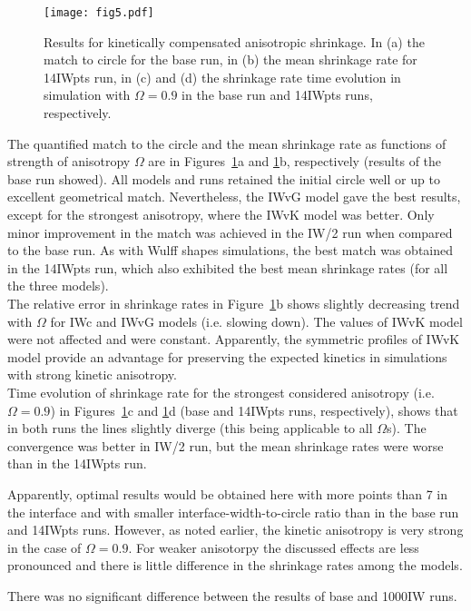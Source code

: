 \begin{figure}[]
	\centering
	\texttt{[image: fig5.pdf]}
	\caption{Results for kinetically compensated anisotropic shrinkage. In (a) the match to circle for the base run, in (b) the mean shrinkage rate for 14IWpts run, in (c) and (d) the shrinkage rate time evolution in simulation with $\Omega=0.9$ in the base run and 14IWpts runs, respectively.}
	\label{fig_companiso}
\end{figure}

The quantified match to the circle and the mean shrinkage rate as functions of strength of anisotropy $\Omega$ are in Figures~\ref{fig_companiso}a and \ref{fig_companiso}b, respectively (results of the base run showed). All models and runs retained the initial circle well or up to excellent geometrical match. Nevertheless, the IWvG model gave the best results, except for the strongest anisotropy, where the IWvK model was better. Only minor improvement in the match was achieved in the IW/2 run when compared to the base run. As with Wulff shapes simulations, the best match was obtained in the 14IWpts run, which also exhibited the best mean shrinkage rates (for all the three models). \\
The relative error in shrinkage rates in Figure~\ref{fig_companiso}b shows slightly decreasing trend with $\Omega$ for IWc and IWvG models (i.e. slowing down). The values of IWvK model were not affected and were constant. Apparently, the symmetric profiles of IWvK model provide an advantage for preserving the expected kinetics in simulations with strong kinetic anisotropy.\\
Time evolution of shrinkage rate for the strongest considered anisotropy (i.e. $\Omega=0.9$) in Figures~\ref{fig_companiso}c and \ref{fig_companiso}d (base and 14IWpts runs, respectively), shows that in both runs the lines slightly diverge (this being applicable to all $\Omega$s). The convergence was better in IW/2 run, but the mean shrinkage rates were worse than in the 14IWpts run.

Apparently, optimal results would be obtained here with more points than 7 in the interface and with smaller interface-width-to-circle ratio than in the base run and 14IWpts runs. However, as noted earlier, the kinetic anisotropy is very strong in the case of $\Omega=0.9$. For weaker anisotorpy the discussed effects are less pronounced and there is little difference in the shrinkage rates among the models.

There was no significant difference between the results of base and 1000IW runs.


